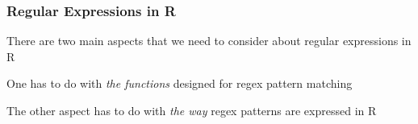 \documentclass[12pt]{beamer}\usepackage[]{graphicx}\usepackage[]{color}
\begin{document}

\begin{frame}
\frametitle{Regular Expressions in R}

\bi
  \item There are two main aspects that we need to consider about regular expressions in R 
  \item One has to do with \textit{the functions} designed for regex pattern matching
  \item The other aspect has to do with \textit{the way} regex patterns are expressed in R
\ei

\end{frame}

\end{document}
